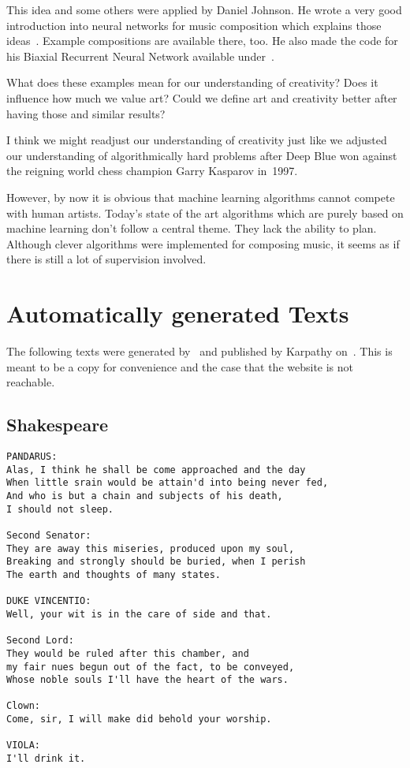 \documentclass[technote,a4paper,leqno]{IEEEtran}
\begin{document}
This idea and some others were applied by Daniel Johnson. He wrote a very good
introduction into neural networks for music composition which explains those
ideas~\cite{Johnson2015}. Example compositions are available there, too. He
also made the code for his Biaxial Recurrent Neural Network available
under~\cite{Johnson2015a}.


What does these examples mean for our understanding of creativity? Does it
influence how much we value art? Could we define art and creativity better
after having those and similar results?

I think we might readjust our understanding of creativity just like we adjusted
our understanding of algorithmically hard problems after Deep Blue won against
the reigning world chess champion Garry Kasparov in~1997.

However, by now it is obvious that machine learning algorithms cannot compete
with human artists. Today's state of the art algorithms which are purely based
on machine learning don't follow a central theme. They lack the ability to
plan. Although clever algorithms were implemented for composing music, it seems
as if there is still a lot of supervision involved.




\printglossary

\section{Automatically generated Texts}\label{sec:appendix-auto-generated-text}
The following texts were generated by~\cite{charRNNgithub} and published by
Karpathy on~\cite{Karpathy2015}. This is meant to be a copy for convenience
and the case that the website is not reachable.

\subsection{Shakespeare}
\begin{verbatim}
PANDARUS:
Alas, I think he shall be come approached and the day
When little srain would be attain'd into being never fed,
And who is but a chain and subjects of his death,
I should not sleep.

Second Senator:
They are away this miseries, produced upon my soul,
Breaking and strongly should be buried, when I perish
The earth and thoughts of many states.

DUKE VINCENTIO:
Well, your wit is in the care of side and that.

Second Lord:
They would be ruled after this chamber, and
my fair nues begun out of the fact, to be conveyed,
Whose noble souls I'll have the heart of the wars.

Clown:
Come, sir, I will make did behold your worship.

VIOLA:
I'll drink it.
\end{verbatim}
\end{document}
